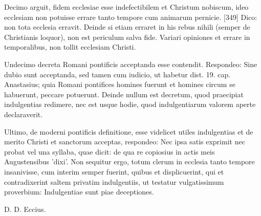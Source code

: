 Decimo arguit, fidem ecclesiae esse indefectibilem et Christum nobiscum, ideo ecclesiam non potuisse errare tanto tempore cum animarum pernicie. [349] Dico: non tota ecclesia erravit. Deinde si etiam erraret in his rebus nihili (semper de Christianis loquor), non est periculum salva fide. Variari opiniones et errare in temporalibus, non tollit ecclesiam Christi.

Undecimo decreta Romani pontificis acceptanda esse contendit. Respondeo: Sine dubio sunt acceptanda, sed tamen cum iudicio, ut habetur dist. 19. cap. Anastasius; quia Romani pontifices homines fuerunt et homines circum se habuerunt, peccare potuerunt. Deinde nullum est decretum, quod praecipiat indulgentias redimere, nec est usque hodie, quod indulgentiarum valorem aperte declaraverit.

Ultimo, de moderni pontificis definitione, esse videlicet utiles indulgentias et de merito Christi et sanctorum acceptas, respondeo: Nec ipsa satis exprimit nec probat vel una syllaba, quae dicit: de qua re copiosius in actis meis Augustensibus 'dixi'. Non sequitur ergo, totum clerum in ecclesia tanto tempore insanivisse, cum interim semper fuerint, quibus et displicuerint, qui et contradixerint saltem privatim indulgentiis, ut testatur vulgatissimum proverbium: Indulgentiae sunt piae deceptiones.

D. D. Eccius.

